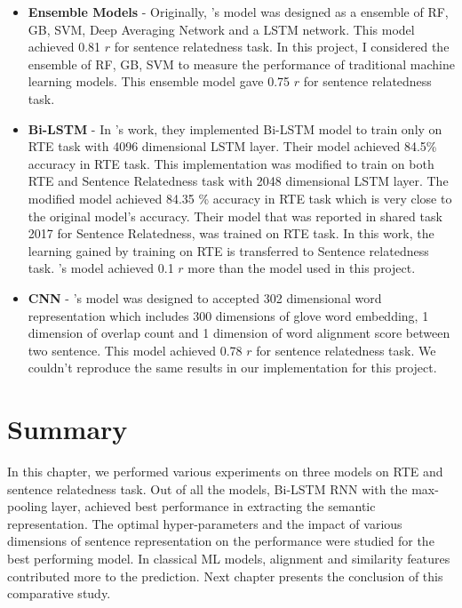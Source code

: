 \documentclass[12pt]{report} %
\begin{document}
\begin{itemize}
	\item \textbf{Ensemble Models} - Originally, \cite{tian2017ecnu}'s model was designed as a ensemble of RF, GB, SVM, Deep Averaging Network and a LSTM network. This model achieved  0.81 $r$ for sentence relatedness task. In this project, I considered the ensemble of RF, GB, SVM to measure the performance of traditional machine learning models. 	This ensemble model gave 0.75 $r$ for sentence relatedness task.  
	\item \textbf{Bi-LSTM} - In \citeauthor{conneau2017supervised}'s work, they implemented Bi-LSTM model to train only on RTE task with 4096 dimensional LSTM layer. Their model achieved 84.5\% accuracy in RTE task. This implementation was modified to train on both RTE and Sentence Relatedness task with 2048 dimensional LSTM layer. The modified model achieved 84.35 \% accuracy in RTE task which is very close to the original model's accuracy. Their model that was reported in shared task 2017 for Sentence Relatedness, was trained on RTE task. In this work, the learning gained by training on  RTE is transferred to Sentence relatedness task. \citeauthor{conneau2017supervised}'s model achieved  0.1 $r$ more than the model used in this project.
	\item \textbf{CNN} - \cite{shao2017hcti}'s model was designed to accepted 302 dimensional word representation which includes  300 dimensions of glove word embedding,  1 dimension of overlap count and 1 dimension of word alignment score between two sentence. This model achieved 0.78 $r$  for sentence relatedness task. We couldn't reproduce the same results in our implementation for this project.
\end{itemize}	

\section{Summary}

In this chapter, we performed various experiments on three models on RTE and sentence relatedness task. Out of all the models, Bi-LSTM RNN with the max-pooling layer, achieved best performance in extracting the semantic representation. The optimal hyper-parameters and the impact of various dimensions of sentence representation on the performance were studied for the best performing model. In classical ML models, alignment and similarity features contributed more to the prediction. Next chapter presents the conclusion of this comparative study.
\end{document}
